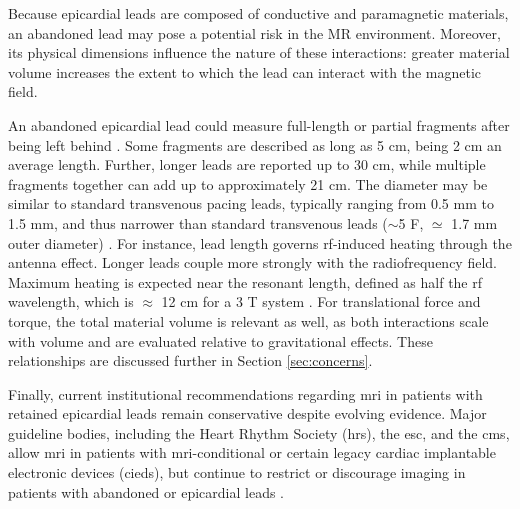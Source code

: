 Because epicardial leads are composed of conductive and paramagnetic materials, an abandoned lead may pose a potential risk in the MR environment. Moreover, its physical dimensions influence the nature of these interactions: greater material volume increases the extent to which the lead can interact with the magnetic field.

An abandoned epicardial lead could measure full-length or partial fragments after being left behind \cite{vuorinen2021,schaller2021}. Some fragments are described as long as 5 cm, being 2 cm an average length. Further, longer leads are reported up to 30 cm, while multiple fragments together can add up to approximately 21 cm. The diameter may be similar to standard transvenous pacing leads, typically ranging from 0.5 mm to 1.5 mm, and thus narrower than standard transvenous leads ($\sim$5 F, $\simeq$ 1.7 mm outer diameter) \cite{vuorinen2021}.
For instance, lead length governs \gls{rf}-induced heating through the antenna effect. Longer leads couple more strongly with the radiofrequency field.  Maximum heating is expected near the resonant length, defined as half the \gls{rf} wavelength, which is $\approx$ 12 cm for a 3 T system \cite{panych2018, aboyewa2021}. For translational force and torque, the total material volume is relevant as well, as both interactions scale with volume and are evaluated relative to gravitational effects. These relationships are discussed further in Section \ref{sec:concerns}.


Finally, current institutional recommendations regarding \gls{mri} in patients with retained epicardial leads remain conservative despite evolving evidence. Major guideline bodies, including the Heart Rhythm Society (\gls{hrs}), the \gls{esc}, and the \gls{cms}, allow \gls{mri} in patients with \gls{mri}-conditional or certain legacy cardiac implantable electronic devices (\glspl{cied}), but continue to restrict or discourage imaging in patients with abandoned or epicardial leads \cite{vuorinen2021}.

